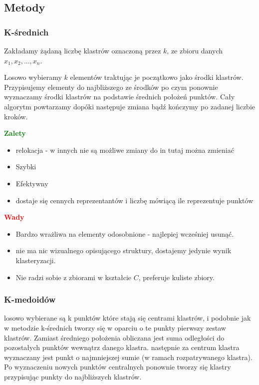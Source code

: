 \subsection{Metody}
\subsubsection{K-średnich}
Zakładamy żądaną liczbę klastrów oznaczoną przez $k$, ze zbioru danych $x_1, x_2, ... , x_n$.

Losowo wybieramy $k$ elementów traktując je początkowo jako środki klastrów. Przypisujemy elementy do najbliższego ze środków po czym ponownie wyznaczamy środki klastrów na podstawie średnich położeń punktów.
Cały algorytm powtarzamy dopóki następuje zmiana bądź kończymy po zadanej liczbie kroków.

\begin{minipage}[t]{0.49\textwidth}
\begin{center}
    \textbf{\textcolor{green}{Zalety}}    
\end{center}
\begin{itemize}
    \item relokacja - w innych nie są możliwe zmiany do in   tutaj można zmieniać
    \item Szybki
    \item Efektywny
    \item dostaje się cennych reprezentantów i liczbę mówiącą ile reprezentuje punktów
\end{itemize}
\end{minipage}
\begin{minipage}[t]{0.49\textwidth}  
\begin{center}
    \textbf{\textcolor{red}{Wady}}
\end{center}
\begin{itemize}
    \item Bardzo wrażliwa na elementy odosobnione - najlepiej wcześniej usunąć.
    \item nie ma nic wizualnego opisującego struktury, dostajemy jedynie wynik klasteryzacji.
    \item Nie radzi sobie z zbiorami w kształcie $C$, preferuje kuliste zbiory.
\end{itemize}    
\end{minipage}

\subsubsection{K-medoidów}
losowo wybierane są k punktów które stają się centrami klastrów, i podobnie jak w metodzie k-średnich tworzy się w oparciu o te punkty pierwszy zestaw klastrów.
Zamiast średniego położenia obliczana jest suma odległości do pozostałych punktów wewnątrz danego klastra. następnie za centrum klastra wyznaczany jest punkt o najmniejszej sumie (w ramach rozpatrywanego klastra). Po wyznaczeniu nowych punktów centralnych ponownie tworzy się klastry przypisując punkty do najbliższych klastrów.

